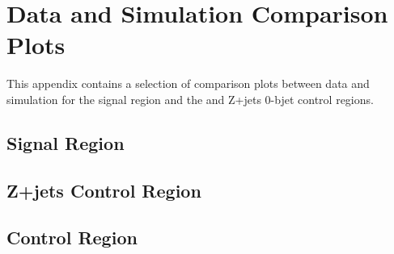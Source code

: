 \chapter{Data and Simulation Comparison Plots}\label{app:plots}
This appendix contains a selection of comparison plots between data and simulation for the signal region and the \ttbar and Z+jets 0-bjet control regions.

\section{Signal Region}\label{appSec:signalRegionPlots}

\section{Z+jets Control Region}\label{appSec:signalRegionPlots}

\section{\ttbar Control Region}\label{appSec:signalRegionPlots}
